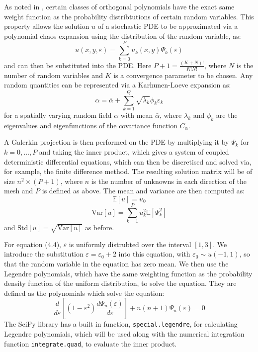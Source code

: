 \documentclass{article}
\numberwithin{equation}{section}
\begin{document}
As noted in \cite{Xiu}, certain classes of orthogonal polynomials have the exact same weight function as the probability distribtutions of certain random variables. This property allows the solution $u$ of a stochastic PDE to be approximated via a polynomial chaos expansion using the distribution of the random variable, as:
\begin{equation}
u(x,y,\varepsilon) = \sum_{k=0}^P u_k(x,y) \Psi_k(\varepsilon)
\end{equation}
and can then be substituted into the PDE. Here $P+1 = \frac{(K+N)!}{K!N!}$, where $N$ is the number of random variables and $K$ is a convergence parameter to be chosen. Any random quantities can be represented via a Karhunen-Loeve expansion as:
\begin{equation}
\alpha =  \bar{\alpha} + \sum_{k=1}^{Q}  \sqrt{\lambda_k} \phi_k \varepsilon_k
\end{equation}
for a spatially varying random field $\alpha$ with mean $\bar{\alpha}$, where $\lambda_k$ and $\phi_k$ are the eigenvalues and eigenfunctions of the covariance function $C_\alpha$.


A Galerkin projection is then performed on the PDE by multiplying it by $\Psi_k$ for $k=0, \dots, P$ and taking the inner product, which gives a system of coupled deterministic differential equations, which can then be discretised and solved via, for example, the finite difference method. The resulting solution matrix will be of size $n^2 \times (P+1)$, where $n$ is the number of unknowns in each direction of the mesh and $P$ is defined as above. The mean and variance are then computed as:
\begin{equation}
\mathbb{E}[u] = u_0
\end{equation}
\begin{equation}
\text{Var}[u] = \sum_{k=1}^P u_k^2 \mathbb{E}[\Psi_k^2]
\end{equation}
and $\text{Std}[u] = \sqrt{\text{Var}[u]}$ as before. 

For equation (4.4), $\varepsilon$ is uniformly distrubted over the interval $[1,3]$. We introduce the substitution $\varepsilon = \varepsilon_0 + 2$ into this equation, with $\varepsilon_0 \sim u(-1,1)$, so that the random variable in the equation has zero mean. We then use the Legendre polynomials, which have the same weighting function as the probability density function of the uniform distribution, to solve the equation. They are defined as the polynomials which solve the equation:
\begin{equation}
\frac{d}{d\varepsilon} \left[ (1-\varepsilon^2) \frac{d\Psi_n(\varepsilon)}{d\varepsilon} \right] + n(n+1) \Psi_n(\varepsilon) = 0 
\end{equation}
The SciPy library has a built in function, \texttt{special.legendre}, for calculating Legendre polynomials, which will be used along with the numerical integration function \texttt{integrate.quad}, to evaluate the inner product. 
\end{document}
